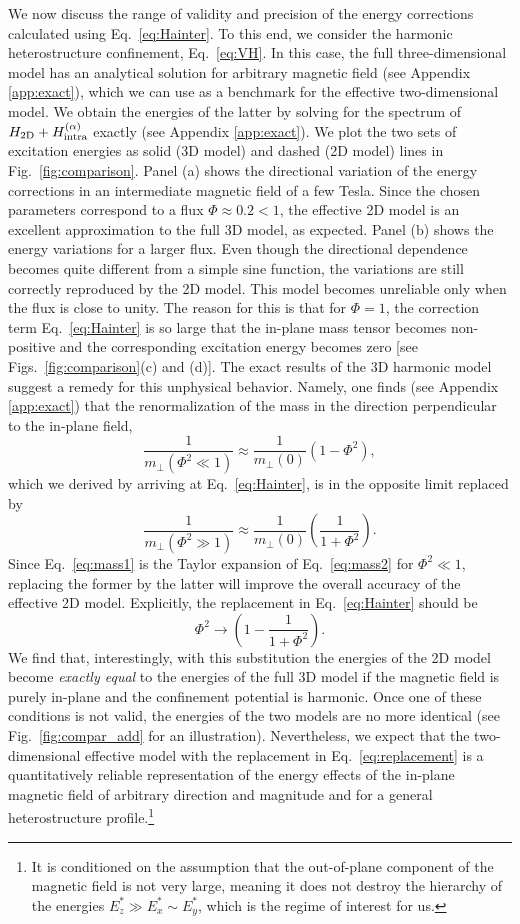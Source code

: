 \documentclass[aps,floatfix,twocolumn,showpacs,10pt,nofootinbib]{revtex4-1}
\newcommand{\be}{\begin{equation}}
\newcommand{\ee}{\end{equation}}
\begin{document}
We now discuss the range of validity and precision of the energy corrections calculated using Eq.~\eqref{eq:Hainter}. To this end, we consider the harmonic heterostructure confinement, Eq.~\eqref{eq:VH}. In this case, the full three-dimensional model has an analytical solution for arbitrary magnetic field (see Appendix \ref{app:exact}), which we can use as a benchmark for the effective two-dimensional model. We obtain the energies of the latter by solving for the spectrum of $H_{\rm 2D} + H^{(\alpha)}_\textrm{intra}$ exactly (see Appendix \ref{app:exact}). We plot the two sets of excitation energies as solid (3D model) and dashed (2D model) lines in Fig.~\ref{fig:comparison}.
Panel (a) shows the directional variation of the energy corrections in an intermediate magnetic field of a few Tesla. Since the chosen parameters correspond to a flux $\Phi\approx 0.2 <1$, the effective 2D model is an excellent approximation to the full 3D model, as expected. Panel (b) shows the energy variations for a larger flux. Even though the directional dependence becomes quite different from a simple sine function, the variations are still correctly reproduced by the 2D model. This model becomes unreliable only when the flux is close to unity.  The reason for this is that for $\Phi=1$, the correction term Eq.~\eqref{eq:Hainter} is so large that the in-plane mass tensor becomes non-positive and the corresponding excitation energy becomes zero [see Figs.~\ref{fig:comparison}(c) and (d)]. The exact results of the 3D harmonic model suggest a remedy for this unphysical behavior. Namely, one finds (see Appendix \ref{app:exact}) that the renormalization of the mass in the direction perpendicular to the in-plane field,
\be
\frac{1}{m_\perp(\Phi^2 \ll 1)} \approx \frac{1}{m_\perp(0)}\left( 1-\Phi^2\right),
\label{eq:mass1}
\ee
which we derived by arriving at Eq.~\eqref{eq:Hainter}, is in the opposite limit replaced by
\be
\frac{1}{m_\perp(\Phi^2 \gg 1)} \approx  \frac{1}{m_\perp(0)}\left(\frac{1}{1+\Phi^2}\right).
\label{eq:mass2}
\ee
Since Eq.~\eqref{eq:mass1} is the Taylor expansion of Eq.~\eqref{eq:mass2} for $\Phi^2\ll 1$, replacing the former by the latter will improve the overall
accuracy  of the effective 2D model. Explicitly, the replacement in Eq.~\eqref{eq:Hainter} should be
\be
\Phi^2 \to \left(1-\frac{1}{1+\Phi^2} \right).
\label{eq:replacement}
\ee
We find that, interestingly, with this substitution the energies of the 2D model become {\it exactly equal} to the energies of the full 3D model if the magnetic field is purely in-plane and the confinement potential is harmonic. Once one of these conditions is not valid, the energies of the two models are no more identical (see Fig.~\ref{fig:compar_add} for an illustration). Nevertheless, we expect that the two-dimensional effective model with the replacement in Eq.~\eqref{eq:replacement} is a quantitatively reliable representation of the energy effects of the in-plane magnetic field of arbitrary direction and magnitude and for a general heterostructure profile.\footnote{It is conditioned on the assumption that the out-of-plane component of the magnetic field is not very large, meaning it does not destroy the hierarchy of the energies $E_z^* \gg E_x^* \sim E_y^*$, which is the regime of interest for us.}
\end{document}
